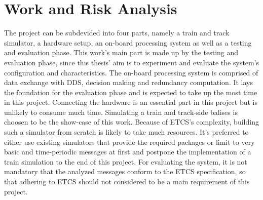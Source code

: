 \documentclass[a4paper, 12pt]{scrartcl}
\begin{document}
\section*{Work and Risk Analysis}
The project can be subdevided into four parts, namely a train and track simulator, a hardware setup, an on-board processing system as well as a testing and evaluation phase.
This work's main part is made up by the testing and evaluation phase, since this thesis' aim is to experiment and evaluate the system's configuration and characteristics.
The on-board processing system is comprised of data exchange with \ac{DDS}, decision making and redundancy computation.
It lays the foundation for the evaluation phase and is expected to take up the most time in this project.
Connecting the hardware is an essential part in this project but is unlikely to consume much time.
Simulating a train and track-side balises is choosen to be the show-case of this work.
Because of \ac{ETCS}'s complexity, building such a simulator from scratch is likely to take much resources.
It's preferred to either use existing simulators that provide the required packages or limit to very basic and time-periodic messages at first and postpone the implementation of a train simulation to the end of this project.
For evaluating the system, it is not mandatory that the analyzed messages conform to the \ac{ETCS} specification, so that adhering to \ac{ETCS} should not considered to be a main requirement of this project.



\end{document}
